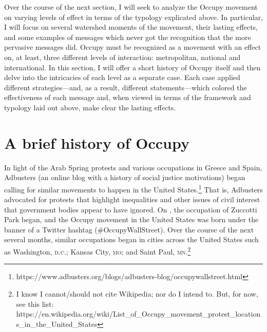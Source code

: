 \documentclass{article}
\begin{document}



Over the course of the next section, I will seek to analyze the Occupy movement on varying levels of effect in terms of the typology explicated above.
In particular, I will focus on several watershed moments of the movement, their lasting effects, and some examples of messages which never got the recognition that the more pervasive messages did.
Occupy must be recognized as a movement with an effect on, at least, three different levels of interaction: metropolitan, national and international.
In this section, I will offer a short history of Occupy itself and then delve into the intricacies of each level as a separate case.
Each case applied different strategies---and, as a result, different statements---which colored the effectiveness of each message and, when viewed in terms of the framework and typology laid out above, make clear the lasting effects.


\section{A brief history of Occupy}
In light of the Arab Spring protests and various occupations in Greece and Spain, Adbusters (an online blog with a history of social justice motivations) began calling for similar movements to happen in the United States.\footnote{https://www.adbusters.org/blogs/adbusters-blog/occupywallstreet.html}
That is, Adbusters advocated for protests that highlight inequalities and other issues of civil interest that government bodies appear to have ignored.
On , the occupation of Zuccotti Park began, and the Occupy movement in the United States was born under the banner of a Twitter hashtag (\#OccupyWallStreet).
Over the course of the next several months, similar occupations began in cities across the United States such as Washington, \textsc{d.c.}; Kansas City, \textsc{mo}; and Saint Paul, \textsc{mn}.\footnote{I know I cannot/should not cite Wikipedia; nor do I intend to. But, for now, see this list: https://en.wikipedia.org/wiki/List\_of\_Occupy\_movement\_protest\_locations\_in\_the\_United\_States}
\end{document}
